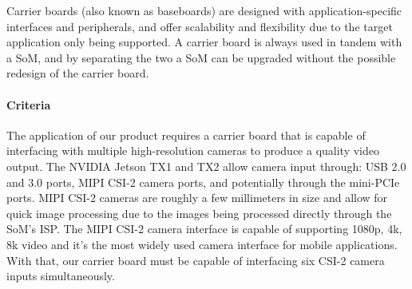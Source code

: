 Carrier boards (also known as baseboards) are designed with application-specific 
interfaces and peripherals, and offer scalability and flexibility due to the target 
application only being supported. A carrier board is always used in tandem with a SoM, 
and by separating the two a SoM can be upgraded without the possible redesign of the 
carrier board\cite{ToradexSBC, ArrowCB, ToradexCBQ}.\\

\paragraph{Criteria}

The application of our product requires a carrier board that is capable of interfacing 
with multiple high-resolution cameras to produce a quality video output. The NVIDIA Jetson TX1 
and TX2 allow camera input through: USB 2.0 and 3.0 ports, MIPI CSI-2 camera ports, and 
potentially through the mini-PCIe ports\cite{JetsonCams}. MIPI CSI-2 cameras are roughly a few millimeters 
in size and allow for quick image processing due to the images being processed directly 
through the SoM's ISP. The MIPI CSI-2 camera interface is capable of supporting 1080p, 
4k, 8k video and it's the most widely used camera interface for mobile 
applications\cite{MIPIOverview}. With that, our carrier board must be capable of interfacing  
six CSI-2 camera inputs simultaneously. \\

